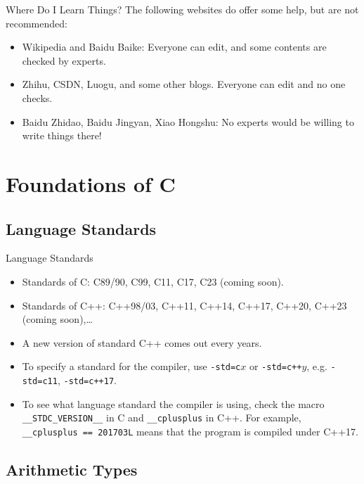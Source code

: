 \documentclass[handout]{beamer}
\begin{document}
\begin{frame}{Where Do I Learn Things?}
    The following websites do offer some help, but are not recommended:
    \begin{itemize}
        \item Wikipedia and Baidu Baike: Everyone can edit, and some contents are checked by experts.
        \item Zhihu, CSDN, Luogu, and some other blogs. Everyone can edit and no one checks.
        \item Baidu Zhidao, Baidu Jingyan, Xiao Hongshu: No experts would be willing to write things there!
    \end{itemize}
\end{frame}

\section{Foundations of C}

\subsection{Language Standards}

\begin{frame}{Language Standards}
    \begin{itemize}
        \item Standards of C: C89/90, C99, C11, C17, C23 (coming soon).
        \item Standards of C++: C++98/03, C++11, C++14, C++17, C++20, C++23 (coming soon),\dots
        \pause
        \item A new version of standard C++ comes out every  years.
        \pause
        \item To specify a standard for the compiler, use \texttt{-std=c}\(x\) or \texttt{-std=c++}\(y\), e.g. \texttt{-std=c11}, \texttt{-std=c++17}.
        \pause
        \item To see what language standard the compiler is using, check the macro \texttt{\_\_STDC\_VERSION\_\_} in C and \texttt{\_\_cplusplus} in C++. For example, \texttt{\_\_cplusplus == 201703L} means that the program is compiled under C++17.
    \end{itemize}
\end{frame}

\subsection{Arithmetic Types}
\end{document}
